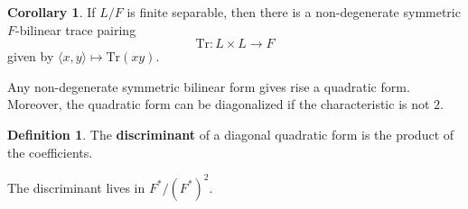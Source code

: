 \documentclass{article}
\theoremstyle{definition}
\theoremstyle{definition}
\newtheorem{definition}{Definition}[theorem]
\theoremstyle{definition}
\theoremstyle{definition}
\theoremstyle{definition}
\theoremstyle{definition}
\newtheorem{corollary}{Corollary}[theorem]
\theoremstyle{definition}
\begin{document}
\begin{tcolorbox}[colback=green!5!white,colframe=green!30!white]
\begin{corollary}
If $L/F$ is finite separable, then there is a non-degenerate symmetric $F$-bilinear trace pairing
\[\textrm{Tr}: L\times L\to F\]
given by $\langle x,y \rangle \mapsto \textrm{Tr}(xy)$. 
\end{corollary}
\end{tcolorbox}

Any non-degenerate symmetric bilinear form gives rise a quadratic form. Moreover, the quadratic form can be diagonalized if the characteristic is not $2$. 


\begin{tcolorbox}[colback=purple!5!white,colframe=purple!75!black]
\begin{definition}
The \textbf{discriminant} of a diagonal quadratic form is the product of the coefficients. 
\end{definition}
\end{tcolorbox}
The discriminant lives in $F^*/(F^*)^2$. 
\end{document}
